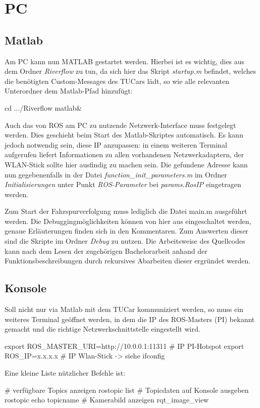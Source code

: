\documentclass[
	11pt,			%
	a4paper,		%
	twoside,		%
	german,			%
	titlepage		%
]{scrartcl}			%
\newcommand{\sh}[1]{\mint[xleftmargin=2em]{shell}{#1}}
\begin{document}
\section{PC}
\subsection{Matlab}
Am PC kann nun MATLAB gestartet werden. Hierbei ist es wichtig, dies aus dem Ordner \emph{Riverflow} zu tun, da sich hier das Skript \emph{startup.m} befindet, welches die benötigten Custom-Messages des TUCars lädt, so wie alle relevanten Unterordner dem Matlab-Pfad hinzufügt:
\begin{she}
cd .../Riverflow
matlab&
\end{she}

Auch das von ROS am PC zu nutzende Netzwerk-Interface muss festgelegt werden. Dies geschieht beim Start des Matlab-Skriptes automatisch. Es kann jedoch notwendig sein, diese IP anzupassen:
\sh{ifconfig} 
\noindent in einem weiteren Terminal aufgerufen liefert Informationen zu allen vorhandenen Netzwerkadaptern, der WLAN-Stick sollte hier ausfindig zu machen sein.
Die gefundene Adresse kann nun gegebenenfalls in der Datei \emph{function\_init\_parameters.m} im Ordner \emph{Initialisierungen} unter Punkt \emph{ROS-Parameter} bei \emph{params.RosIP} eingetragen werden.

Zum Start der Fahrspurverfolgung muss lediglich die Datei main.m ausgeführt werden. Die Debuggingmöglichkeiten können von hier aus eingeschaltet werden, genaue Erläuterungen finden sich in den Kommentaren. Zum Auswerten dieser sind die Skripte im Ordner \emph{Debug} zu nutzen. Die Arbeitsweise des Quellcodes kann nach dem Lesen der zugehörigen Bachelorarbeit anhand der Funktionsbeschreibungen durch rekursives Abarbeiten dieser ergründet werden.

\subsection{Konsole}
Soll nicht nur via Matlab mit dem TUCar kommuniziert werden, so muss ein weiteres Terminal geöffnet werden, in dem die IP des ROS-Masters (PI) bekannt gemacht und die richtige Netzwerkschnittstelle eingestellt wird.
\begin{she}
export ROS_MASTER_URI=http://10.0.0.1:11311 # IP PI-Hotspot
export ROS_IP=x.x.x.x # IP Wlan-Stick -> siehe ifconfig
\end{she}
\noindent Eine kleine Liste nützlicher Befehle ist:
\begin{she}
# verfügbare Topics anzeigen
rostopic list
# Topicdaten auf Konsole ausgeben
rostopic echo topicname
# Kamerabild anzeigen
rqt_image_view
\end{she}
\end{document}
